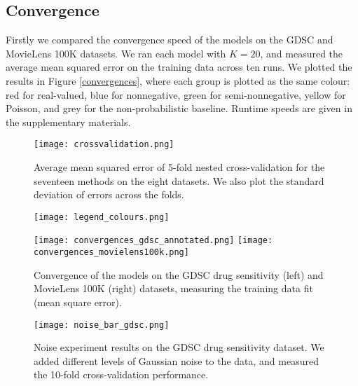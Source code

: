 \documentclass[letterpaper]{article} %
\begin{document}
	\subsection{Convergence}%
		Firstly we compared the convergence speed of the models on the GDSC and MovieLens 100K datasets. We ran each model with $K=20$, and measured the average mean squared error on the training data across ten runs. We plotted the results in Figure \ref{convergences}, where each group is plotted as the same colour: red for real-valued, blue for nonnegative, green for semi-nonnegative, yellow for Poisson, and grey for the non-probabilistic baseline.
		Runtime speeds are given in the supplementary materials.
		
		\begin{figure*}[t]
			\centering
			\begin{minipage}{0.38 \textwidth}
				\centering
				\texttt{[image: crossvalidation.png]}
				\caption{Average mean squared error of 5-fold nested cross-validation for the seventeen methods on the eight datasets. We also plot the standard deviation of errors across the folds.} 
				\label{crossvalidation}
			\end{minipage}
			\hspace{0.02\textwidth}
			\begin{minipage}{0.59 \textwidth}
				\begin{minipage}{\columnwidth}
					\centering
					\texttt{[image: legend\_colours.png]}
					
					\vspace{5pt}
					
					\texttt{[image: convergences\_gdsc\_annotated.png]}
					\texttt{[image: convergences\_movielens100k.png]}
					\caption{Convergence of the models on the GDSC drug sensitivity (left) and MovieLens 100K (right) datasets, measuring the training data fit (mean square error).} 
					\label{convergences}
				\end{minipage}
			
				\vspace{25pt}
			
				\begin{minipage}{\columnwidth}
					\centering
					\texttt{[image: noise\_bar\_gdsc.png]}
					\caption{Noise experiment results on the GDSC drug sensitivity dataset. We added different levels of Gaussian noise to the data, and measured the 10-fold cross-validation performance.}
					\label{noise_gdsc}
				\end{minipage}
			\end{minipage}
		\end{figure*}
	
\end{document}
